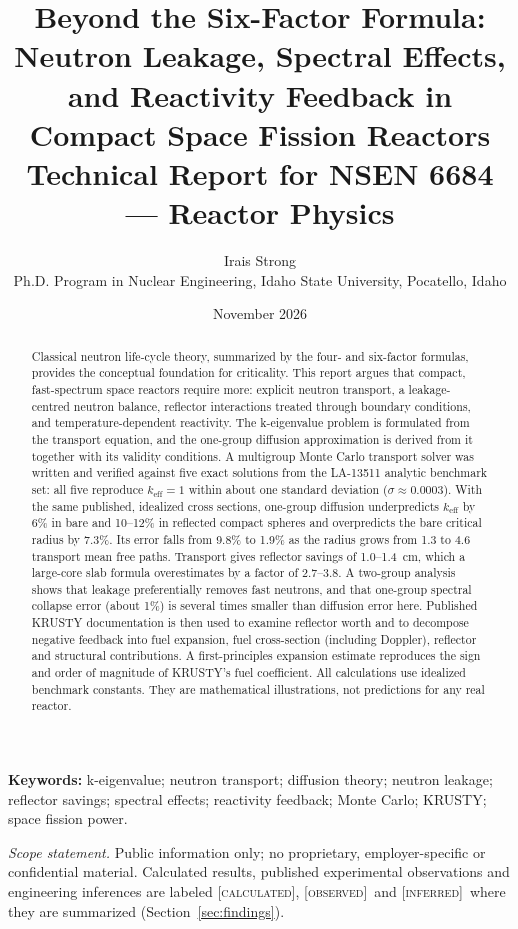 \documentclass[11pt,letterpaper]{article}
\title{\textbf{Beyond the Six-Factor Formula: Neutron Leakage, Spectral Effects, and Reactivity Feedback in Compact Space Fission Reactors}\\[0.6em]
\large Technical Report for NSEN 6684 --- Reactor Physics}
\author{Irais Strong\\[0.2em]
\normalsize Ph.D. Program in Nuclear Engineering, Idaho State University, Pocatello, Idaho}
\date{November 2026}
\newcommand{\keff}{k_\mathrm{eff}}
\newcommand{\calc}{\textsc{[calculated]}}
\newcommand{\obs}{\textsc{[observed]}}
\newcommand{\infr}{\textsc{[inferred]}}
\begin{document}
\maketitle
\thispagestyle{empty}

\begin{abstract}
\noindent
Classical neutron life-cycle theory, summarized by the four- and six-factor formulas, provides the conceptual foundation for criticality. This report argues that compact, fast-spectrum space reactors require more: explicit neutron transport, a leakage-centred neutron balance, reflector interactions treated through boundary conditions, and temperature-dependent reactivity. The k-eigenvalue problem is formulated from the transport equation, and the one-group diffusion approximation is derived from it together with its validity conditions. A multigroup Monte Carlo transport solver was written and verified against five exact solutions from the LA-13511 analytic benchmark set: all five reproduce $\keff = 1$ within about one standard deviation ($\sigma \approx 0.0003$). With the same published, idealized cross sections, one-group diffusion underpredicts $\keff$ by 6\% in bare and 10--12\% in reflected compact spheres and overpredicts the bare critical radius by 7.3\%. Its error falls from 9.8\% to 1.9\% as the radius grows from 1.3 to 4.6 transport mean free paths. Transport gives reflector savings of 1.0--1.4~cm, which a large-core slab formula overestimates by a factor of 2.7--3.8. A two-group analysis shows that leakage preferentially removes fast neutrons, and that one-group spectral collapse error (about 1\%) is several times smaller than diffusion error here. Published KRUSTY documentation is then used to examine reflector worth and to decompose negative feedback into fuel expansion, fuel cross-section (including Doppler), reflector and structural contributions. A first-principles expansion estimate reproduces the sign and order of magnitude of KRUSTY's fuel coefficient. All calculations use idealized benchmark constants. They are mathematical illustrations, not predictions for any real reactor.
\end{abstract}

\noindent\textbf{Keywords:} k-eigenvalue; neutron transport; diffusion theory; neutron leakage; reflector savings; spectral effects; reactivity feedback; Monte Carlo; KRUSTY; space fission power.

\vspace{0.5em}
\noindent\small\textit{Scope statement.} Public information only; no proprietary, employer-specific or confidential material. Calculated results, published experimental observations and engineering inferences are labeled \calc, \obs\ and \infr\ where they are summarized (Section~\ref{sec:findings}).\normalsize
\end{document}
